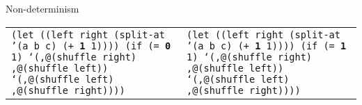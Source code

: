 \begin{frame}{Non-determinism}
\begin{tabularx}{\textwidth}{ X X }
    \texttt{(let ((left right (split-at '(a b c)\newline
      \hphantom{\_\_\_\_\_\_\_\_\_\_\_\_\_\_\_\_\_\_\_}
      (+ \textbf{1} 1))))\newline
      \hphantom{\_\_}(if (= \textbf{0} 1)\newline
      \hphantom{\_\_\_\_\_\_}`(,@(shuffle right)\newline
      \hphantom{ \_\_\_\_\_\_\_},@(shuffle left))\newline
      \hphantom{ \_\_\_\_}`(,@(shuffle left)\newline
      \hphantom{ \_\_\_\_\_\_},@(shuffle right))))\newline
      \ 
    }
    &
    \texttt{(let ((left right (split-at '(a b c)\newline
      \hphantom{\_\_\_\_\_\_\_\_\_\_\_\_\_\_\_\_\_\_\_}
      (+ \textbf{1} 1))))\newline
      \hphantom{\_\_}(if (= \textbf{1} 1)\newline
      \hphantom{\_\_\_\_\_\_}`(,@(shuffle right)\newline
      \hphantom{ \_\_\_\_\_\_\_},@(shuffle left))\newline
      \hphantom{ \_\_\_\_}`(,@(shuffle left)\newline
      \hphantom{ \_\_\_\_\_\_},@(shuffle right))))\newline
      \ 
    }

  \end{tabularx}
\end{frame}


